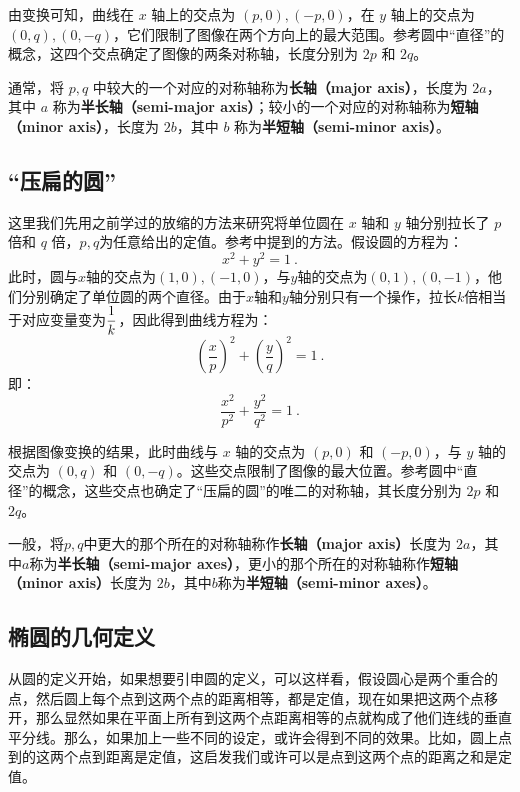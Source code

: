 由变换可知，曲线在 $x$ 轴上的交点为 $(p, 0), (-p, 0)$，在 $y$ 轴上的交点为 $(0, q), (0, -q)$，它们限制了图像在两个方向上的最大范围。参考圆中“直径”的概念，这四个交点确定了图像的两条对称轴，长度分别为 $2p$ 和 $2q$。

通常，将 $p, q$ 中较大的一个对应的对称轴称为\textbf{长轴（major axis）}，长度为 $2a$，其中 $a$ 称为\textbf{半长轴（semi-major axis）}；较小的一个对应的对称轴称为\textbf{短轴（minor axis）}，长度为 $2b$，其中 $b$ 称为\textbf{半短轴（semi-minor axis）}。
\subsection{“压扁的圆”}

这里我们先用之前学过的放缩的方法来研究将单位圆在 $x$ 轴和 $y$ 轴分别拉长了 $p$ 倍和 $q$ 倍，$p,q$为任意给出的定值。参考中提到的方法。假设圆的方程为：
\begin{equation}
x^2 + y^2 = 1~.
\end{equation}
此时，圆与$x$轴的交点为$(1,0),(-1,0)$，与$y$轴的交点为$(0,1),(0,-1)$，他们分别确定了单位圆的两个直径。由于$x$轴和$y$轴分别只有一个操作，拉长$k$倍相当于对应变量变为$\displaystyle{1\over k}$，因此得到曲线方程为：
\begin{equation}
\left(\frac{x}{p}\right)^2 + \left(\frac{y}{q}\right)^2 = 1~.
\end{equation}
即：
\begin{equation}\label{eq_Elips3_2}
\frac{x^2}{p^2} + \frac{y^2}{q^2} = 1~.
\end{equation}

根据图像变换的结果，此时曲线与 $x$ 轴的交点为 $(p, 0)$ 和 $(-p, 0)$，与 $y$ 轴的交点为 $(0, q)$ 和 $(0, -q)$。这些交点限制了图像的最大位置。参考圆中“直径”的概念，这些交点也确定了“压扁的圆”的唯二的对称轴，其长度分别为 $2p$ 和 $2q$。

一般，将$p,q$中更大的那个所在的对称轴称作\textbf{长轴（major axis）}长度为 $2a$，其中$a$称为\textbf{半长轴（semi-major axes）}，更小的那个所在的对称轴称作\textbf{短轴（minor axis）}长度为 $2b$，其中$b$称为\textbf{半短轴（semi-minor axes）}。


\subsection{椭圆的几何定义}

从圆的定义开始，如果想要引申圆的定义，可以这样看，假设圆心是两个重合的点，然后圆上每个点到这两个点的距离相等，都是定值，现在如果把这两个点移开，那么显然如果在平面上所有到这两个点距离相等的点就构成了他们连线的垂直平分线。那么，如果加上一些不同的设定，或许会得到不同的效果。比如，圆上点到的这两个点到距离是定值，这启发我们或许可以是点到这两个点的距离之和是定值。

